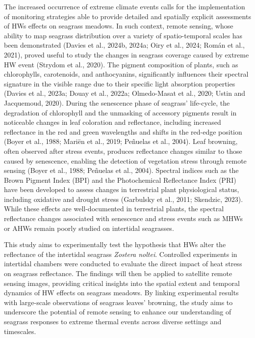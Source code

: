 \documentclass[
  letterpaper,
  11pt,
  english,
  singlespacing,
  headsepline]{MastersDoctoralThesis}
\begin{document}
\begin{spacing}{1.5}
The increased occurrence of extreme climate events calls for the
implementation of monitoring strategies able to provide detailed and
spatially explicit assessments of HWs effects on seagrass meadows. In
such context, remote sensing, whose ability to map seagrass distribution
over a variety of spatio-temporal scales has been demonstrated (Davies
et al., 2024b, 2024a; Oiry et al., 2024; Román et al., 2021), proved
useful to study the changes in seagrass coverage caused by extreme HW
event (Strydom et al., 2020). The pigment composition of plants, such as
chlorophylls, carotenoids, and anthocyanins, significantly influences
their spectral signature in the visible range due to their specific
light absorption properties (Davies et al., 2023a; Douay et al., 2022a;
Olmedo-Masat et al., 2020; Ustin and Jacquemoud, 2020). During the
senescence phase of seagrass' life-cycle, the degradation of chlorophyll
and the unmasking of accessory pigments result in noticeable changes in
leaf coloration and reflectance, including increased reflectance in the
red and green wavelengths and shifts in the red-edge position (Boyer et
al., 1988; Mariën et al., 2019; Peñuelas et al., 2004). Leaf browning,
often observed after stress events, produces reflectance changes similar
to those caused by senescence, enabling the detection of vegetation
stress through remote sensing (Boyer et al., 1988; Peñuelas et al.,
2004). Spectral indices such as the Brown Pigment Index (BPI) and the
Photochemical Reflectance Index (PRI) have been developed to assess
changes in terrestrial plant physiological status, including oxidative
and drought stress (Garbulsky et al., 2011; Skendzic, 2023). While these
effects are well-documented in terrestrial plants, the spectral
reflectance changes associated with senescence and stress events such as
MHWs or AHWs remain poorly studied on intertidal seagrasses.

This study aims to experimentally test the hypothesis that HWs alter the
reflectance of the intertidal seagrass \emph{Zostera noltei}. Controlled
experiments in intertidal chambers were conducted to evaluate the direct
impact of heat stress on seagrass reflectance. The findings will then be
applied to satellite remote sensing images, providing critical insights
into the spatial extent and temporal dynamics of HW effects on seagrass
meadows. By linking experimental results with large-scale observations
of seagrass leaves' browning, the study aims to underscore the potential
of remote sensing to enhance our understanding of seagrass responses to
extreme thermal events across diverse settings and timescales.


\end{spacing}
\end{document}
